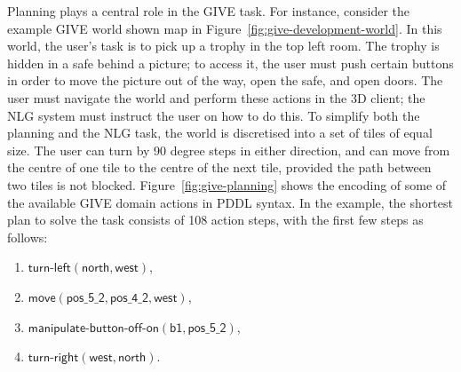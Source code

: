 Planning plays a central role in the GIVE task. For instance, consider the
example GIVE world shown map in Figure~\ref{fig:give-development-world}. In
this world, the user's task is to pick up a trophy in the top left room.
The trophy is hidden in a safe behind a picture; to access it, the user
must push certain buttons in order to move the picture out of the way, open
the safe, and open doors. The user must navigate the world and perform
these actions in the 3D client; the NLG system must instruct the user on
how to do this. To simplify both the planning and the NLG task, the world
is discretised into a set of tiles of equal size. The user can turn by 90
degree steps in either direction, and can move from the centre of one tile
to the centre of the next tile, provided the path between two tiles is not
blocked. Figure~\ref{fig:give-planning} shows the encoding of some of the
available GIVE domain actions in PDDL syntax. In the example, the shortest
plan to solve the task consists of 108 action steps, with the first few
steps as follows:
%
\begin{enumerate}
\item $\mathsf{turn}\textsf{-}\mathsf{left}(\mathsf{north},
\mathsf{west})$,
\item $\mathsf{move}(\mathsf{pos\_5\_2}, \mathsf{pos\_4\_2}, \mathsf{west})$,
\item $\mathsf{manipulate}\textsf{-}\mathsf{button}\textsf{-}\mathsf{off}\textsf{-}\mathsf{on}(\mathsf{b1, pos\_5\_2})$,
\item $\mathsf{turn}\textsf{-}\mathsf{right}(\mathsf{west}, \mathsf{north})$.
\end{enumerate}

